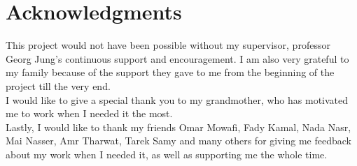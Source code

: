 \chapter*{Acknowledgments}
\label{chap:ack}

This project would not have been possible without my supervisor, professor Georg Jung's continuous support and encouragement. I am also very grateful to my family because of the support they gave to me from the beginning of the project till the very end.\\

I would like to give a special thank you to my grandmother, who has motivated me to work when I needed it the most.\\

Lastly, I would like to thank my friends Omar Mowafi, Fady Kamal, Nada Nasr, Mai Nasser, Amr Tharwat, Tarek Samy and many others for giving me feedback about my work when I needed it, as well as supporting me the whole time.